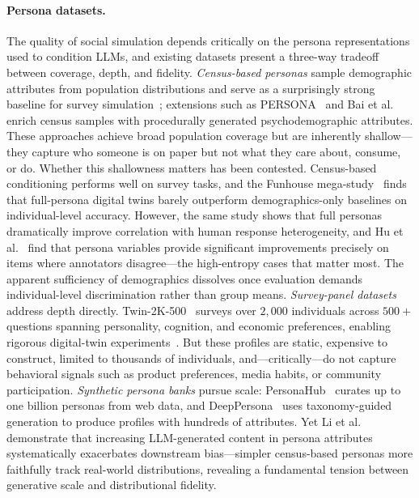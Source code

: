 \paragraph{Persona datasets.}
The quality of social simulation depends critically on the persona representations used to condition LLMs, and existing datasets present a three-way tradeoff between coverage, depth, and fidelity.
\emph{Census-based personas} sample demographic attributes from population distributions and serve as a surprisingly strong baseline for survey simulation~\cite{argyle2023out}; extensions such as PERSONA~\cite{castricato_persona_2024} and Bai et al.~\cite{bai_agentic_2024} enrich census samples with procedurally generated psychodemographic attributes.
These approaches achieve broad population coverage but are inherently shallow---they capture who someone is on paper but not what they care about, consume, or do.
Whether this shallowness matters has been contested.
Census-based conditioning performs well on survey tasks, and the Funhouse mega-study~\cite{funhouse} finds that full-persona digital twins barely outperform demographics-only baselines on individual-level accuracy.
However, the same study shows that full personas dramatically improve correlation with human response heterogeneity, and Hu et al.~\cite{hu_quantifying_2024} find that persona variables provide significant improvements precisely on items where annotators disagree---the high-entropy cases that matter most.
The apparent sufficiency of demographics dissolves once evaluation demands individual-level discrimination rather than group means.
%
\emph{Survey-panel datasets} address depth directly.
Twin-2K-500~\cite{twin2k500} surveys over $2{,}000$ individuals across $500{+}$ questions spanning personality, cognition, and economic preferences, enabling rigorous digital-twin experiments~\cite{funhouse}.
But these profiles are static, expensive to construct, limited to thousands of individuals, and---critically---do not capture behavioral signals such as product preferences, media habits, or community participation.
%
\emph{Synthetic persona banks} pursue scale: PersonaHub~\cite{personahub} curates up to one billion personas from web data, and DeepPersona~\cite{deeppersona} uses taxonomy-guided generation to produce profiles with hundreds of attributes.
Yet Li et al.~\cite{li_llm_2025} demonstrate that increasing LLM-generated content in persona attributes systematically exacerbates downstream bias---simpler census-based personas more faithfully track real-world distributions, revealing a fundamental tension between generative scale and distributional fidelity.
